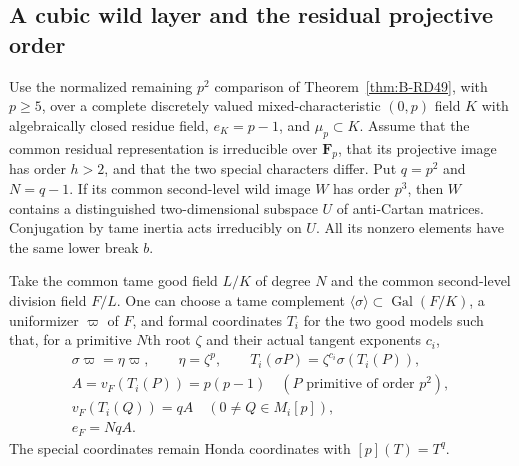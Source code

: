 \subsection{A cubic wild layer and the residual projective order}

\begin{lemma}
\label{lem:B-RD56-anti-layer}
Use the normalized remaining $p^2$ comparison of
Theorem~\ref{thm:B-RD49}, with $p\ge5$, over a complete discretely
valued mixed-characteristic $(0,p)$ field $K$ with algebraically
closed residue field, $e_K=p-1$, and $\mu_p\subset K$.
Assume that the common residual representation is irreducible over
$\mathbf F_p$, that its projective image has order $h>2$, and that
the two special characters differ. Put $q=p^2$ and $N=q-1$.
If its common second-level wild image $W$ has order $p^3$, then
$W$ contains a distinguished two-dimensional subspace $U$ of
anti-Cartan matrices. Conjugation by tame inertia acts irreducibly
on $U$. All its nonzero elements have the same lower break $b$.

Take the common tame good field $L/K$ of degree $N$ and the common
second-level division field $F/L$. One can choose a tame complement
$\langle\sigma\rangle\subset\operatorname{Gal}(F/K)$, a uniformizer
$\varpi$ of $F$, and formal coordinates $T_i$ for the two good
models such that, for a primitive $N$th root $\zeta$ and their
actual tangent exponents $c_i$,
\[
 \begin{gathered}
 \sigma\varpi=\eta\varpi,\qquad \eta=\zeta^p,\qquad
 T_i(\sigma P)=\zeta^{c_i}\sigma(T_i(P)),\\
 A=v_F(T_i(P))=p(p-1)\quad(P\text{ primitive of order }p^2),\\
 v_F(T_i(Q))=qA\quad(0\ne Q\in M_i[p]),\\
                         e_F=NqA.                       \tag{B-RD56.1}
 \end{gathered}
\]
The special coordinates remain Honda coordinates with $[p](T)=T^q$.
\end{lemma}
